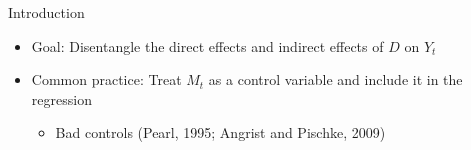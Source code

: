\documentclass[aspectratio=1610, 9pt]{beamer}
\begin{document}
\begin{frame}{Introduction}
\begin{itemize}
    \vspace{0.1cm}
    \item Goal: Disentangle the direct effects and indirect effects of $D$ on $Y_t$
    
      \vspace{0.1cm}
    \item Common practice: Treat $M_t$ as a control variable and include it in the regression
    
    \begin{itemize}
        \item[-] Bad controls (Pearl, 1995; Angrist and Pischke, 2009)
    \end{itemize}

\end{itemize}

\end{frame}
\end{document}
